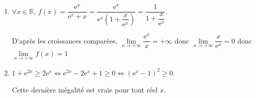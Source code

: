 \documentclass[10pt]{article}
\providecommand{\R}{\mathbb{R}}
\providecommand{\e}{{\mathrm{e}}}
\begin{document}
\begin{enumerate}
$-x^2-4x-1$ s'annule pour $x_1=-2-\sqrt{3}$ et pour $x_2=-2+\sqrt{3}$ car $\Delta = 12$.

Le trinôme du second degré s'annule donc deux fois et change donc aussi de signe.

\hfill {}
	\item $\forall x \in \R$, $f(x)=\dfrac{\e^x}{\e^x+x}=\dfrac{\e^x}{\e^x\left(1+\dfrac{x}{\e^x}\right)}=\dfrac{1}{1+\dfrac{x}{\e^x}}$.

D'après les croissances comparées, $\lim \limits_{n \rightarrow +\infty} \dfrac{\e^x}{x}=+\infty$ donc $\lim \limits_{n \rightarrow +\infty} \dfrac{x}{\e^x}=0$ donc $\lim \limits_{n \rightarrow +\infty} f(x)=1$

\hfill {}
		\item $1+\e^{2x}\geqslant 2\e^x \iff \e^{2x}-2\e^x+1\geqslant0 \iff \left(\e^x-1\right)^2\geqslant0$.

Cette dernière inégalité est vraie pour tout réel $x$.
\hfill {}
\end{enumerate}
\end{document}
